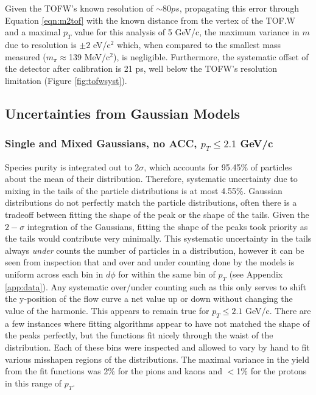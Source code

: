 Given the TOFW's known resolution of $\sim 80 ps$, propagating this error through Equation \ref{eqn:m2tof} with the known distance from the vertex of the TOF.W and a maximal $p_T$ value for this analysis of 5 GeV/c, the maximum variance in $m$ due to resolution is $\pm 2$ eV/c$^2$ which, when compared to the smallest mass measured ($m_{\pi}\approx$139 MeV/c$^2$), is negligible. Furthermore, the systematic offset of the detector after calibration is 21 ps, well below the TOFW's resolution limitation (Figure \ref{fig:tofwsyst}).

\subsection{Uncertainties from Gaussian Models}
\subsubsection{Single and Mixed Gaussians, no ACC, $p_T\leq2.1$ GeV/c}
Species purity is integrated out to $2\sigma$, which accounts for 95.45\% of particles about the mean of their distribution. Therefore, systematic uncertainty due to mixing in the tails of the particle distributions is at most 4.55\%. Gaussian distributions do not perfectly match the particle distributions, often there is a tradeoff between fitting the shape of the peak or the shape of the tails. Given the $2-\sigma$ integration of the Gaussians, fitting the shape of the peaks took priority as the tails would contribute very minimally. This systematic uncertainty in the tails always \textit{under} counts the number of particles in a distribution, however it can be seen from inspection that and over and under counting done by the models is uniform across each bin in $d\phi$ for within the same bin of $p_T$ (see Appendix \ref{app:data}). Any systematic over/under counting such as this only serves to shift the y-position of the flow curve a net value up or down without changing the value of the harmonic. This appears to remain true for $p_T \leq 2.1$ GeV/c. There are a few instances where fitting algorithms appear to have not matched the shape of the peaks perfectly, but the functions fit nicely through the waist of the distribution. Each of these bins were inspected and allowed to vary by hand to fit various misshapen regions of the distributions. The maximal variance in the yield from the fit functions was 2\% for the pions and kaons and $<$1\% for the protons in this range of $p_T$.

